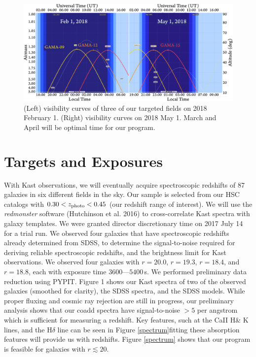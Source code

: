 \documentclass[letterpaper,12pt]{article}
\begin{document}
\begin{figure}[hbt]
\includegraphics[width=\textwidth]{specz_fig3.pdf}
\caption{
(Left) visibility curves of three of our targeted fields on 2018 February 1. (Right) visibility curves on 2018
May 1. March and April will be optimal time for our program.}
\end{figure}

\clearpage

\section{Targets and Exposures}

With Kast observations, we will eventually acquire spectroscopic redshifts of 87 galaxies in six different fields in
the sky. Our sample is selected from our HSC catalogs with  $0.30<z_{\rm photo}<0.45$ (our redshift range of interest).
We will use the {\it redmonster} software (Hutchinson et al. 2016) to cross-correlate Kast spectra with galaxy
templates. We were granted director discretionary time on 2017 July 14 for a trial run. We observed four galaxies that
have spectroscopic redshifts already determined from SDSS, to determine the signal-to-noise required for deriving
reliable spectroscopic redshifts, and the brightness limit for Kast observations. We observed four galaxies with
$r=20.0$, $r=19.3$, $r=18.4$, and $r=18.8$, each with exposure time $3600\textrm{---}5400$\,s. We performed
preliminary data reduction using PYPIT. Figure 1 shows our Kast spectra of two of the observed galaxies (smoothed for
clarity), the SDSS spectra, and the SDSS models. While proper fluxing and cosmic ray rejection are still in progress,
our preliminary analysis shows that our coadd spectra have signal-to-noise $>5$ per angstrom which is sufficient for
measuring a redshift. Key features, such at the CaII H\& K lines, and the H$\delta$ line can be seen in Figure
\ref{spectrum}\textemdash fitting these absorption features will provide us with redshifts. Figure \ref{spectrum}
shows that our program is feasible for galaxies with $r\lesssim20$.
\end{document}
